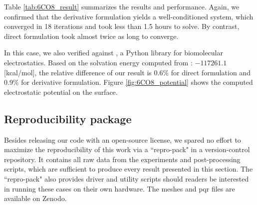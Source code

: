 Table \ref{tab:6CO8_result} summarizes the results and performance.
Again, we confirmed that the derivative formulation yields a well-conditioned system, which converged in 18 iterations and took less than 1.5 hours to solve.
By contrast, direct formulation took almost twice as long to converge.

In this case, we also verified against \pygbe \cite{cooper2016pygbe}, a Python \bem library for biomolecular electrostatics.
Based on the solvation energy computed from \pygbe: $-117261.1$ [kcal/mol], the relative difference of our result is 0.6\% for direct formulation and 0.9\% for derivative formulation.
Figure \ref{fig:6CO8_potential} shows the computed electrostatic potential on the surface.

\subsection{Reproducibility package}

Besides releasing our code with an open-source license, we spared no effort to maximize the reproducibility of this work via a ``repro-pack" in a version-control repository.
It contains all raw data from the experiments and post-processing scripts, which are sufficient to produce every result presented in this section.
The ``repro-pack" also provides driver and utility scripts should readers be interested in running these cases on their own hardware.
The meshes and pqr files are available on Zenodo.